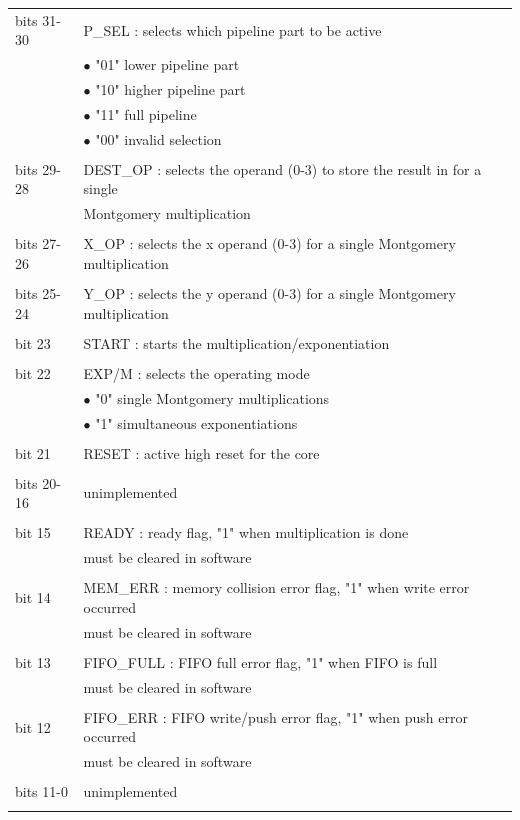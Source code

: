 \begin{tabular}{ll}
bits 31-30 	& P\_SEL : selects which pipeline part to be active\\
 			& $\bullet$  "01" lower pipeline part\\
 			& $\bullet$  "10" higher pipeline part\\
 			& $\bullet$  "11" full pipeline\\
 			& $\bullet$  "00" invalid selection\\
 			&\\
bits 29-28 	& DEST\_OP : selects the operand (0-3) to store the result in for a single\\
 			& Montgomery multiplication\footnotemark\\
 			&\\
bits 27-26 	& X\_OP : selects the x operand (0-3) for a single Montgomery multiplication\footnotemark[\value{footnote}]\\
			&\\
bits 25-24 	& Y\_OP : selects the y operand (0-3) for a single Montgomery multiplication\footnotemark[\value{footnote}]\\
			&\\
bit 23 		& START : starts the multiplication/exponentiation\\
			&\\
bit 22 		& EXP/M : selects the operating mode\\
 			& $\bullet$  "0" single Montgomery multiplications\\
 			& $\bullet$  "1" simultaneous exponentiations\\
 			&\\
bit 21 		& RESET : active high reset for the core\footnotemark[2]\\
			&\\		
bits 20-16	& unimplemented\\
			&\\
bit 15		& READY : ready flag, "1" when multiplication is done\\
			& must be cleared in software\\
			&\\
bit 14		& MEM\_ERR : memory collision error flag, "1" when write error occurred\\
			& must be cleared in software\\
			&\\
bit 13		& FIFO\_FULL : FIFO full error flag, "1" when FIFO is full\\
			& must be cleared in software\\
			&\\
bit 12		& FIFO\_ERR : FIFO write/push error flag, "1" when push error occurred\\
			& must be cleared in software\\
			&\\
bits 11-0	& unimplemented\\
			&\\
\end{tabular}
